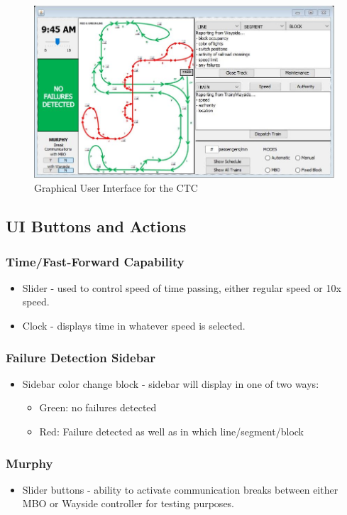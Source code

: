 \documentclass[letterpaper]{article}
\begin{document}
\begin{figure}[h!]
	\centering
	\includegraphics[width=16cm]{CTC_gui}
	\caption{Graphical User Interface for the CTC}
\end{figure}

\subsection{UI Buttons and Actions}

\subsubsection{Time/Fast-Forward Capability}
\begin{itemize}
	\item Slider - used to control speed of time passing, either regular speed or 10x speed.
	\item Clock - displays time in whatever speed is selected.
\end{itemize}

\subsubsection{Failure Detection Sidebar}
\begin{itemize}
	\item Sidebar color change block - sidebar will display in one of two ways:
	\begin{itemize}
		\item Green: no failures detected
		\item Red: Failure detected as well as in which line/segment/block
	\end{itemize}
\end{itemize}

\subsubsection{Murphy}
\begin{itemize}
	\item Slider buttons - ability to activate communication breaks between either MBO or Wayside controller for testing purposes.
\end{itemize}
\end{document}
